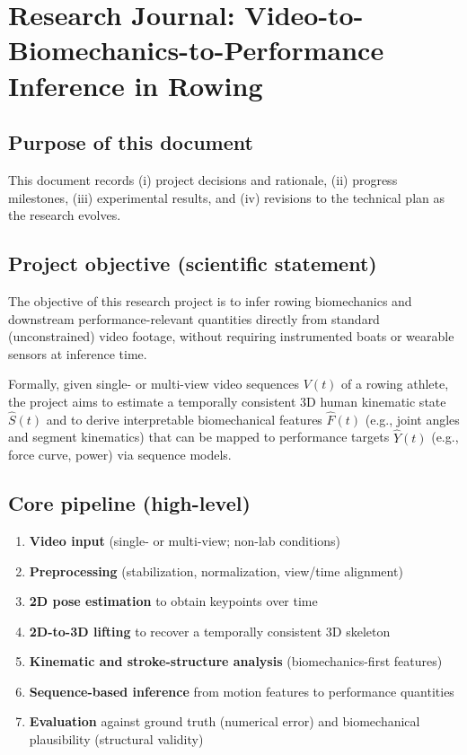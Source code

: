 \documentclass[11pt]{article}
\begin{document}
\section*{Research Journal: Video-to-Biomechanics-to-Performance Inference in Rowing}

\subsection*{Purpose of this document}
This document records (i) project decisions and rationale, (ii) progress milestones, (iii) experimental results, and (iv) revisions to the technical plan as the research evolves.

\subsection*{Project objective (scientific statement)}
The objective of this research project is to infer rowing biomechanics and downstream performance-relevant quantities directly from standard (unconstrained) video footage, without requiring instrumented boats or wearable sensors at inference time.

Formally, given single- or multi-view video sequences $V(t)$ of a rowing athlete, the project aims to estimate a temporally consistent 3D human kinematic state $\hat{S}(t)$ and to derive interpretable biomechanical features $\hat{F}(t)$ (e.g., joint angles and segment kinematics) that can be mapped to performance targets $\hat{Y}(t)$ (e.g., force curve, power) via sequence models.

\subsection*{Core pipeline (high-level)}
\begin{enumerate}
	\item \textbf{Video input} (single- or multi-view; non-lab conditions)
	\item \textbf{Preprocessing} (stabilization, normalization, view/time alignment)
	\item \textbf{2D pose estimation} to obtain keypoints over time
	\item \textbf{2D-to-3D lifting} to recover a temporally consistent 3D skeleton
	\item \textbf{Kinematic and stroke-structure analysis} (biomechanics-first features)
	\item \textbf{Sequence-based inference} from motion features to performance quantities
	\item \textbf{Evaluation} against ground truth (numerical error) and biomechanical plausibility (structural validity)
\end{enumerate}
\end{document}
